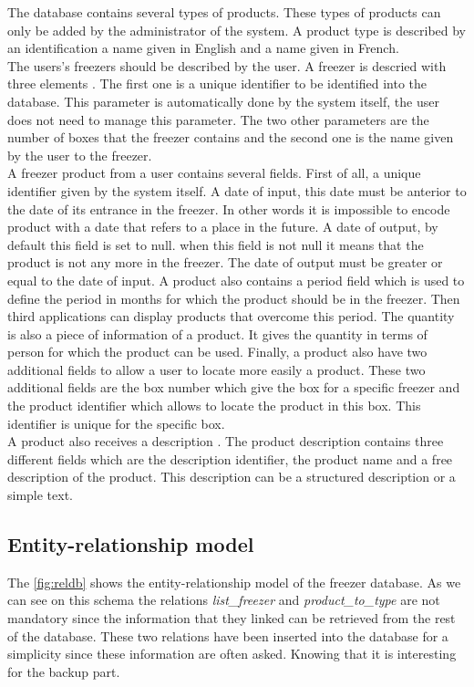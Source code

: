 The database contains several types of products. These types of products can only be added by the administrator of the system. A product type is described by an identification a name given in English and a name given in French. \\

The users's freezers should be described by the user. A freezer is descried with three elements . The first one is a unique identifier to be identified into the database. This parameter is automatically done by the system itself, the user does not need to manage this parameter. The two other parameters are the number of boxes that the freezer contains and the second one is the name given by the user to the freezer. \\

A freezer product from a user contains several fields. First of all, a unique identifier given by the system itself. A date of input, this date must be anterior to the date of its entrance in the freezer. In other words it is impossible to encode product with a date that refers to a place in the future. A date of output, by default this field is set to null. when this field is not null it means that the product is not any more in the freezer. The date of output must be greater or equal to the date of input. A product also contains a period field which is used to define the period in months for which the product should be in the freezer. Then third applications can display products that overcome this period. The quantity is also a piece of information of a product. It gives  the quantity in terms of person for which the product can be used. Finally, a product also have two additional fields to allow a user to locate more easily a product. These two additional fields are the box number which give the box for a specific freezer and the product identifier which allows to locate the product in this box. This identifier is unique for the specific box. \\

A product also receives a description . The product description contains three different fields which are the description identifier, the product name and a free description of the product. This description can be a structured description or a simple text. \\

\subsection{Entity-relationship model}
The \autoref{fig:reldb} shows the entity-relationship model of the freezer database. As we can see on this schema the relations \textit{list\_freezer} and \textit{product\_to\_type} are not mandatory since the information that they linked can be retrieved from the rest of the database. These two relations have been inserted into the database for a simplicity since these information are often asked. Knowing that it is interesting for the backup part. \\

